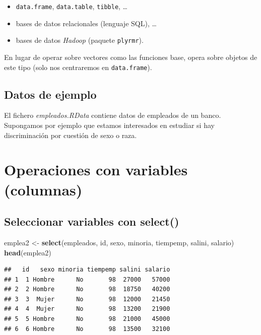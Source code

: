 \documentclass[]{book}
\newenvironment{Shaded}{\begin{snugshade}}{\end{snugshade}}
\newcommand{\KeywordTok}[1]{\textcolor[rgb]{0.13,0.29,0.53}{\textbf{#1}}}
\newcommand{\NormalTok}[1]{#1}
\newcommand{\StringTok}[1]{\textcolor[rgb]{0.31,0.60,0.02}{#1}}
\providecommand{\tightlist}{%
  \setlength{\itemsep}{0pt}\setlength{\parskip}{0pt}}
\begin{document}
\begin{itemize}
\tightlist
\item
  \texttt{data.frame}, \texttt{data.table}, \texttt{tibble}, \ldots{}
\item
  bases de datos relacionales (lenguaje SQL), \ldots{}
\item
  bases de datos \emph{Hadoop} (paquete \texttt{plyrmr}).
\end{itemize}

En lugar de operar sobre vectores como las funciones base,
opera sobre objetos de este tipo (solo nos centraremos en \texttt{data.frame}).

\hypertarget{datos-de-ejemplo}{%
\subsection{Datos de ejemplo}\label{datos-de-ejemplo}}

El fichero \emph{empleados.RData} contiene datos de empleados de un banco.
Supongamos por ejemplo que estamos interesados en estudiar si hay
discriminación por cuestión de sexo o raza.

\hypertarget{operaciones-con-variables-columnas}{%
\section{Operaciones con variables (columnas)}\label{operaciones-con-variables-columnas}}

\hypertarget{seleccionar-variables-con-select}{%
\subsection{\texorpdfstring{Seleccionar variables con \textbf{select()}}{Seleccionar variables con select()}}\label{seleccionar-variables-con-select}}

\begin{Shaded}
\begin{Highlighting}[]
\NormalTok{emplea2 <-}\StringTok{ }\KeywordTok{select}\NormalTok{(empleados, id, sexo, minoria, tiempemp, salini, salario)}
\KeywordTok{head}\NormalTok{(emplea2)}
\end{Highlighting}
\end{Shaded}

\begin{verbatim}
##   id   sexo minoria tiempemp salini salario
## 1  1 Hombre      No       98  27000   57000
## 2  2 Hombre      No       98  18750   40200
## 3  3  Mujer      No       98  12000   21450
## 4  4  Mujer      No       98  13200   21900
## 5  5 Hombre      No       98  21000   45000
## 6  6 Hombre      No       98  13500   32100
\end{verbatim}
\end{document}
